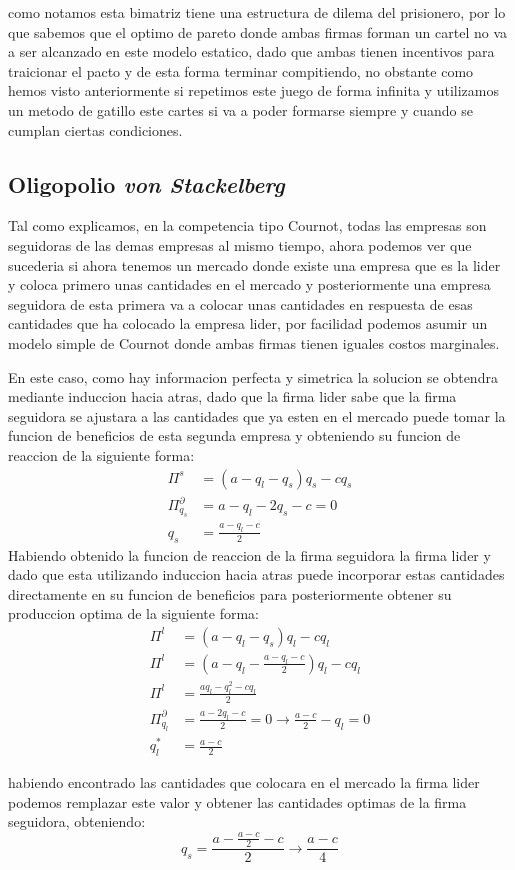 \documentclass[11pt]{article}
\begin{document}
\begin{flushleft}
    como notamos esta  bimatriz tiene una estructura de dilema del prisionero, por lo que sabemos que el optimo de pareto donde ambas firmas forman un cartel no va a ser alcanzado en este modelo estatico, dado que ambas tienen incentivos para traicionar el pacto y de esta forma terminar compitiendo, no obstante como hemos visto anteriormente si repetimos este juego de forma infinita y utilizamos un metodo de gatillo este cartes si va a poder formarse siempre y cuando se cumplan ciertas condiciones.

\subsection{Oligopolio \textit{von Stackelberg}}

    Tal como explicamos, en la competencia tipo Cournot, todas las empresas son seguidoras de las demas empresas al mismo tiempo, ahora podemos ver que sucederia si ahora tenemos un mercado donde existe una empresa que es la lider y coloca primero unas cantidades en el mercado y posteriormente una empresa seguidora de esta primera va a colocar unas cantidades en respuesta de esas cantidades que ha colocado la empresa lider, por facilidad podemos asumir un modelo simple de Cournot donde ambas firmas tienen iguales costos marginales.

    En este caso, como hay informacion perfecta y simetrica la solucion se obtendra mediante induccion hacia atras, dado que la firma lider sabe que la firma seguidora se ajustara a las cantidades que ya esten en el mercado puede tomar la funcion de beneficios de esta segunda empresa y obteniendo su funcion de reaccion de la siguiente forma:
    \begin{align*}
        \Pi^s&=(a-q_l-q_s)q_s-cq_s\\
        \Pi^\partial_{q_s}&=a-q_l-2q_s-c=0\\
        q_s&=\frac{a-q_l-c}{2}
    \end{align*}
    Habiendo obtenido la funcion de reaccion de la firma seguidora la firma lider y dado que esta utilizando induccion hacia atras puede incorporar estas cantidades directamente en su funcion de beneficios para posteriormente obtener su produccion optima de la siguiente forma:
    \begin{align*}
        \Pi^l&=(a-q_l-q_s)q_l-cq_l\\
        \Pi^l&=\left(a-q_l-\frac{a-q_l-c}{2}\right)q_l-cq_l\\
        \Pi^l&=\frac{aq_l-q_l^2-cq_l}{2}\\
        \Pi^\partial_{q_l}&=\frac{a-2q_l-c}{2}=0\to\frac{a-c}{2}-q_l=0\\
        q^*_l&=\frac{a-c}{2}
    \end{align*}
    
    habiendo encontrado las cantidades que colocara en el mercado la firma lider podemos remplazar este valor y obtener las cantidades optimas de la firma seguidora, obteniendo:
    $$q_s=\frac{a-\frac{a-c}{2}-c}{2}\to\frac{a-c}{4}$$
    
\end{flushleft}
\end{document}

